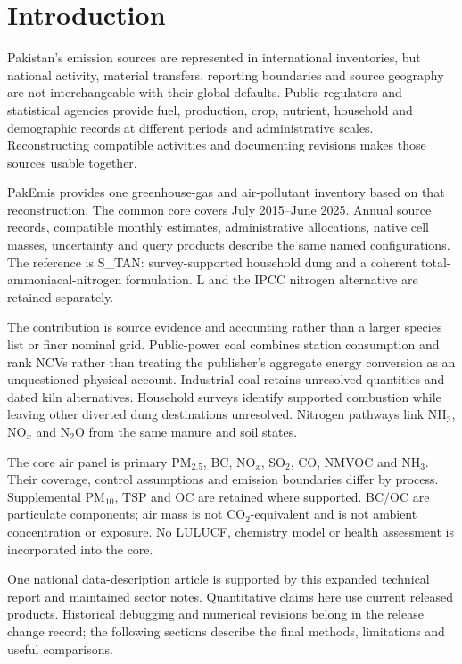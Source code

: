 \section{Introduction}\label{sec:introduction}
Pakistan's emission sources are represented in international inventories, but national activity, material transfers, reporting boundaries and source geography are not interchangeable with their global defaults. Public regulators and statistical agencies provide fuel, production, crop, nutrient, household and demographic records at different periods and administrative scales. Reconstructing compatible activities and documenting revisions makes those sources usable together.

PakEmis provides one greenhouse-gas and air-pollutant inventory based on that reconstruction. The common core covers July 2015--June 2025. Annual source records, compatible monthly estimates, administrative allocations, native cell masses, uncertainty and query products describe the same named configurations. The reference is S\_TAN: survey-supported household dung and a coherent total-ammoniacal-nitrogen formulation. L and the IPCC nitrogen alternative are retained separately.

The contribution is source evidence and accounting rather than a larger species list or finer nominal grid. Public-power coal combines station consumption and rank NCVs rather than treating the publisher's aggregate energy conversion as an unquestioned physical account. Industrial coal retains unresolved quantities and dated kiln alternatives. Household surveys identify supported combustion while leaving other diverted dung destinations unresolved. Nitrogen pathways link NH$_3$, NO$_x$ and N$_2$O from the same manure and soil states.

The core air panel is primary PM$_{2.5}$, BC, NO$_x$, SO$_2$, CO, NMVOC and NH$_3$. Their coverage, control assumptions and emission boundaries differ by process. Supplemental PM$_{10}$, TSP and OC are retained where supported. BC/OC are particulate components; air mass is not CO$_2$-equivalent and is not ambient concentration or exposure. No LULUCF, chemistry model or health assessment is incorporated into the core.

One national data-description article is supported by this expanded technical report and maintained sector notes. Quantitative claims here use current released products. Historical debugging and numerical revisions belong in the release change record; the following sections describe the final methods, limitations and useful comparisons.
